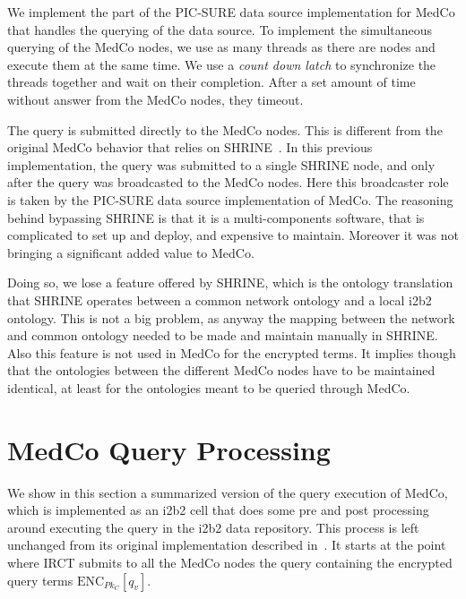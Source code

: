 We implement the part of the PIC-SURE data source implementation for MedCo that handles the querying of the data source.
To implement the simultaneous querying of the MedCo nodes, we use as many threads as there are nodes and execute them at the same time. 
We use a \emph{count down latch} to synchronize the threads together and wait on their completion.
After a set amount of time without answer from the MedCo nodes, they timeout.

The query is submitted directly to the MedCo nodes. 
This is different from the original MedCo behavior that relies on SHRINE~\cite{todo}.
In this previous implementation, the query was submitted to a single SHRINE node, and only after the query was broadcasted to the MedCo nodes.
Here this broadcaster role is taken by the PIC-SURE data source implementation of MedCo.
The reasoning behind bypassing SHRINE is that it is a multi-components software, that is complicated to set up and deploy, and expensive to maintain.
Moreover it was not bringing a significant added value to MedCo.

Doing so, we lose a feature offered by SHRINE, which is the ontology translation that SHRINE operates between a common network ontology and a local i2b2 ontology.
This is not a big problem, as anyway the mapping between the network and common ontology needed to be made and maintain manually in SHRINE.
Also this feature is not used in MedCo for the encrypted terms.
It implies though that the ontologies between the different MedCo nodes have to be maintained identical, at least for the ontologies meant to be queried through MedCo.


\section{MedCo Query Processing}
\label{sec:medco-query}

We show in this section a summarized version of the query execution of MedCo, which is implemented as an i2b2 cell that does some pre and post processing around executing the query in the i2b2 data repository.
This process is left unchanged from its original implementation described in~\cite{todo}.
It starts at the point where IRCT submits to all the MedCo nodes the query containing the encrypted query terms $\text{ENC}_{Pk_C}[q_v]$.

